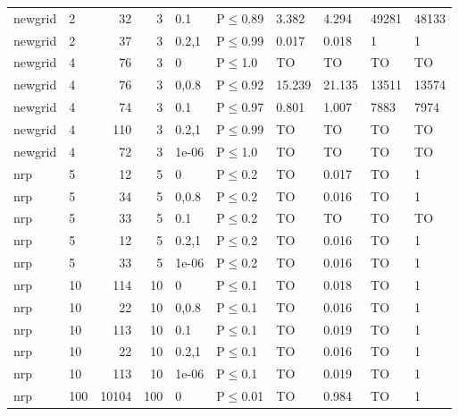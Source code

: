 \begin{longtable}{llrrllllll}
 newgrid       & 2         &     	32 &    3 & 0.1   & P$\leq$0.89  & 3.382    & 4.294    & 49281   & 48133  \\
 newgrid       & 2         &     	37 &    3 & 0.2,1 & P$\leq$0.99  & 0.017    & 0.018    & 1       & 1      \\
 newgrid       & 4         &     	76 &    3 & 0     & P$\leq$1.0   & TO       & TO       & TO      & TO     \\
 newgrid       & 4         &     	76 &    3 & 0,0.8 & P$\leq$0.92  & 15.239   & 21.135   & 13511   & 13574  \\
 newgrid       & 4         &     	74 &    3 & 0.1   & P$\leq$0.97  & 0.801    & 1.007    & 7883    & 7974   \\
 newgrid       & 4         &    	110 &    3 & 0.2,1 & P$\leq$0.99  & TO       & TO       & TO      & TO     \\
 newgrid       & 4         &     	72 &    3 & 1e-06 & P$\leq$1.0   & TO       & TO       & TO      & TO     \\
 nrp           & 5         &     	12 &    5 & 0     & P$\leq$0.2   & TO       & 0.017    & TO      & 1      \\
 nrp           & 5         &     	34 &    5 & 0,0.8 & P$\leq$0.2   & TO       & 0.016    & TO      & 1      \\
 nrp           & 5         &     	33 &    5 & 0.1   & P$\leq$0.2   & TO       & TO       & TO      & TO     \\
 nrp           & 5         &     	12 &    5 & 0.2,1 & P$\leq$0.2   & TO       & 0.016    & TO      & 1      \\
 nrp           & 5         &     	33 &    5 & 1e-06 & P$\leq$0.2   & TO       & 0.016    & TO      & 1      \\
 nrp           & 10        &    	114 &   10 & 0     & P$\leq$0.1   & TO       & 0.018    & TO      & 1      \\
 nrp           & 10        &     	22 &   10 & 0,0.8 & P$\leq$0.1   & TO       & 0.016    & TO      & 1      \\
 nrp           & 10        &    	113 &   10 & 0.1   & P$\leq$0.1   & TO       & 0.019    & TO      & 1      \\
 nrp           & 10        &     	22 &   10 & 0.2,1 & P$\leq$0.1   & TO       & 0.016    & TO      & 1      \\
 nrp           & 10        &    	113 &   10 & 1e-06 & P$\leq$0.1   & TO       & 0.019    & TO      & 1      \\
 nrp           & 100       &  	10104 &  100 & 0     & P$\leq$0.01  & TO       & 0.984    & TO      & 1      \\

\end{longtable}
